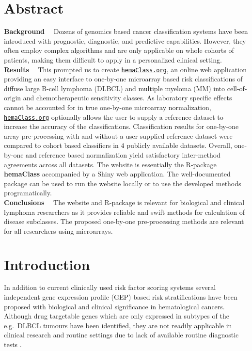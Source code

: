 \documentclass[10pt,letterpaper]{article}
\newcommand{\hemaClass}{\href{http://hemaClass.org}{\texttt{hemaClass.org}}}
\newcommand{\R}{\textsf{R}}
\newcommand{\pkg}[1]{\textbf{#1}}
\newcommand{\parttitle}[1]{\noindent\textbf{#1}~~}
\begin{document}
\section*{Abstract}
\parttitle{Background} %
Dozens of genomics based cancer classification systems have been introduced with prognostic, diagnostic, and predictive capabilities.
However, they often employ complex algorithms and are only applicable on whole cohorts of patients, making them difficult to apply in a personalized clinical setting.
\\\parttitle{Results}
This prompted us to create \hemaClass{}, an online web application providing an easy interface to one-by-one microarray based risk classifications of diffuse large B-cell lymphoma (DLBCL) and multiple myeloma (MM) into cell-of-origin and chemotherapeutic sensitivity classes.
As laboratory specific effects cannot be accounted for in true one-by-one microarray normalization, \hemaClass{} optionally allows the user to supply a reference dataset to increase the accuracy of the classifications. Classification results for one-by-one array pre-processing with and without a user supplied reference dataset were compared to cohort based classifiers in $4$ publicly available datasets.
Overall, one-by-one and reference based normalization yield satisfactory inter-method agreements across all datasets.
The website is essentially the \R{}-package \pkg{hemaClass} accompanied by a Shiny web application.
The well-documented package can be used to run the website locally or to use the developed methods programatically.
\\\parttitle{Conclusions}
The website and \R{}-package is relevant for biological and clinical lymphoma researchers as it provides reliable and swift methods for calculation of disease subclasses.
The proposed one-by-one pre-processing methods are relevant for all researchers using microarrays.
\medskip\\


\linenumbers

\section*{Introduction}
In addition to current clinically used risk factor scoring systems several independent gene expression profile (GEP) based risk stratifications have been proposed with biological and clinical significance in hematological cancers.
Although drug targetable genes which are only expressed in subtypes of the e.g.\ DLBCL tumours have been identified, they are not readily applicable in clinical research and routine settings due to lack of available routine diagnostic tests \cite{Jaffe2009, Sehn2014}.
\end{document}
